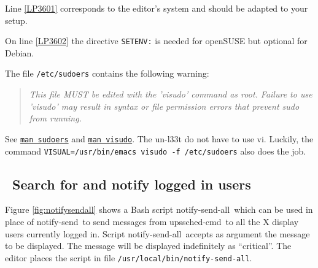 \documentclass[12pt]{article}
\newlength{\headersep}\setlength{\headersep}{3mm}
\newcommand{\Hsep}{\hspace{\headersep}}
\newcommand{\newcolumn}{\vfill\eject}
\newcommand{\upsschedcmd}{\mbox{\textcolor{CMDCOLOUR}{upssched-cmd}}}
\newcommand{\notifysend}{\mbox{\textcolor{NOTIFYCOLOUR}{notify-send}}}
\newcommand{\notifysendall}{\mbox{\textcolor{NOTIFYCOLOUR}{notify-send-all}}}
\begin{document}
Line \ref{LP3601} corresponds to the editor's system and should be adapted to
your setup.  

On line \ref{LP3602} the directive \texttt{SETENV:} is needed for openSUSE but
optional for Debian.

The file \texttt{/etc/sudoers} contains the following warning:
\begin{quotation}
\emph{This file MUST be edited with the 'visudo' command as root.  Failure to use
'visudo' may result in syntax or file permission errors that prevent sudo from
running.}
\end{quotation}

See \href{https://www.sudo.ws/man/1.8.13/sudoers.man.html}{\texttt{man
    sudoers}} and
\href{https://www.sudo.ws/man/1.8.13/visudo.man.html}{\texttt{man visudo}}.
The un-l33t do not have to use vi.  Luckily, the command
\texttt{VISUAL=/usr/{\allowbreak}bin/{\allowbreak}emacs visudo -f
  /etc/sudoers} also does the job.


\vspace*{\fill}

\begin{center}
\end{center}

\vspace*{\fill}

\newcolumn
\subsection{\Hsep\ Search for and notify logged in users}\label{section:notifysend.user}

Figure \ref{fig:notifysendall} shows a Bash script \notifysendall\ which can
be used in place of \notifysend\ to send messages from \upsschedcmd\ to all
the X display users currently logged in.  Script \notifysendall\ accepts as
argument the message to be displayed.  The message will be displayed
indefinitely as ``critical''.  The editor places the script in file
\texttt{/usr/local/bin/{\allowbreak}notify-send-all}.
\end{document}
